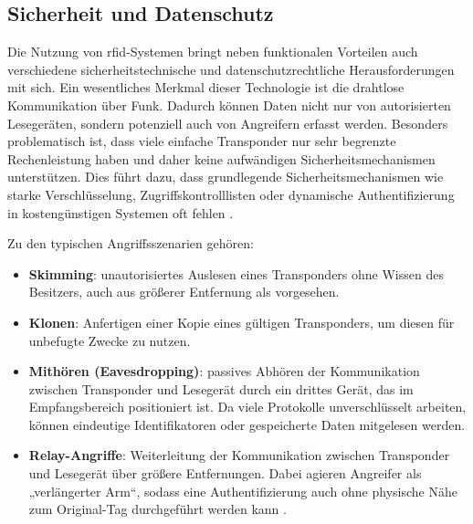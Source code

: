%



\subsection{Sicherheit und Datenschutz}

Die Nutzung von \ac{rfid}-Systemen bringt neben funktionalen Vorteilen auch verschiedene sicherheitstechnische und datenschutzrechtliche Herausforderungen mit sich. 
Ein wesentliches Merkmal dieser Technologie ist die drahtlose Kommunikation über Funk. 
Dadurch können Daten nicht nur von autorisierten Lesegeräten, sondern potenziell auch von Angreifern erfasst werden. 
Besonders problematisch ist, dass viele einfache Transponder nur sehr begrenzte Rechenleistung haben und daher keine aufwändigen Sicherheitsmechanismen unterstützen. 
Dies führt dazu, dass grundlegende Sicherheitsmechanismen wie starke Verschlüsselung, Zugriffskontrolllisten oder dynamische Authentifizierung in kostengünstigen Systemen oft fehlen \cite{Mitrokotsa:2010,Aragones:2007}.

Zu den typischen Angriffsszenarien gehören:
\begin{itemize}
	\item \textbf{Skimming}: unautorisiertes Auslesen eines Transponders ohne Wissen des Besitzers, auch aus größerer Entfernung als vorgesehen.
	\item \textbf{Klonen}: Anfertigen einer Kopie eines gültigen Transponders, um diesen für unbefugte Zwecke zu nutzen.
	\item \textbf{Mithören (Eavesdropping)}: passives Abhören der Kommunikation zwischen Transponder und Lesegerät durch ein drittes Gerät, das im Empfangsbereich positioniert ist. Da viele Protokolle unverschlüsselt arbeiten, können eindeutige Identifikatoren oder gespeicherte Daten mitgelesen werden.
	\item \textbf{Relay-Angriffe}: Weiterleitung der Kommunikation zwischen Transponder und Lesegerät über größere Entfernungen. Dabei agieren Angreifer als „verlängerter Arm“, sodass eine Authentifizierung auch ohne physische Nähe zum Original-Tag durchgeführt werden kann \cite{juels:2005,Mitrokotsa:2010}.
\end{itemize}

